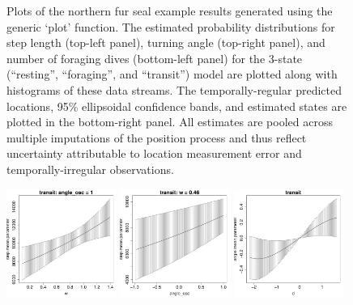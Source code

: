 \documentclass[12pt]{article}\usepackage[]{graphicx}\usepackage[]{color}
\begin{document}
\begin{figure}[htbp]
  \caption{Plots of the northern fur seal example results generated using the generic `plot' function. The estimated probability distributions for step length (top-left panel), turning angle (top-right panel), and number of foraging dives (bottom-left panel) for the 3-state (``resting'', ``foraging'', and ``transit'') model are plotted along with histograms of these data streams. The temporally-regular predicted locations, 95\% ellipsoidal confidence bands, and estimated states are plotted in the bottom-right panel. All estimates are pooled across multiple imputations of the position process and thus reflect uncertainty attributable to location measurement error and temporally-irregular observations.}
  \label{fig:nfsResults}
\end{figure}

\begin{figure}[htbp]
  \centering
  \includegraphics[width=0.32\textwidth]{plot_turtleResults001.pdf}
  \includegraphics[width=0.32\textwidth]{plot_turtleResults002.pdf}
  \includegraphics[width=0.32\textwidth]{plot_turtleResults004.pdf}

\end{figure}
\end{document}
